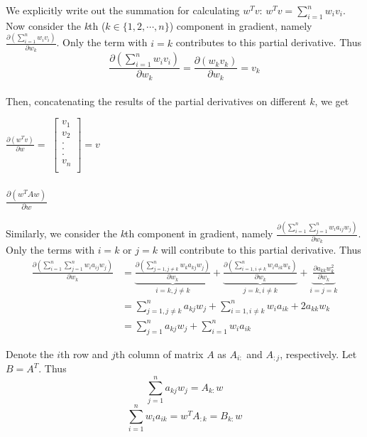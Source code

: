 \documentclass[11pt]{article}
\begin{document}
We explicitly write out the summation for calculating $w^{T}v$: $w^{T}v = \sum_{i=1}^n w_i v_i$. \\

Now consider the \textit{k}th ($k \in \{1, 2, \cdots, n\}$) component in gradient, namely $\frac{\partial (\sum_{i=1}^n w_i v_i)}{\partial w_k}$. Only the term with $i = k$ contributes to this partial derivative. Thus $$\frac{\partial (\sum_{i=1}^n w_i v_i)}{\partial w_k} = \frac{\partial (w_k v_k)}{\partial w_k} = v_k $$ \\

Then, concatenating the results of the partial derivatives on different $k$, we get
    \begin{center}
    $\frac{\partial (w^{T}v)}{\partial w} =$
    $\begin{bmatrix}
    v_1\\ 
    v_2 \\ . \\.\\.\\
    v_n\\
    \end{bmatrix}  = v$ 
    \end{center}

\subsubsection{$\frac{\partial (w^{T}Aw)}{\partial w}$}
Similarly, we consider the \textit{k}th component in gradient, namely $\frac{\partial (\sum_{i=1}^n \sum_{j=1}^n w_i a_{ij} w_j)}{\partial w_k}$. Only the terms with $i = k$ or $j = k$ will contribute to this partial derivative. Thus 
\begin{equation}
\begin{split}
\frac{\partial (\sum_{i=1}^n \sum_{j=1}^n w_i a_{ij} w_j)}{\partial w_k} & = \underbrace{\frac{\partial (\sum_{j = 1, j \neq k}^n w_k a_{kj} w_j)}{\partial w_k}}_{i = k, j \neq k}+\underbrace{\frac{\partial (\sum_{i = 1, i \neq k}^n w_i a_{ik} w_k)}{\partial w_k}}_{j = k, i \neq k} + \underbrace{\frac{\partial {a_{kk} w_k^2}}{\partial w_k}}_{i=j=k} \\
&= \sum_{j = 1, j \neq k}^n a_{kj} w_j+ \sum_{i = 1, i \neq k}^n w_i a_{ik} + 2 a_{kk}w_k\\
&=\sum_{j = 1}^n a_{kj} w_j+ \sum_{i = 1}^n w_i a_{ik}
\end{split}
\end{equation}

Denote the $i$th row and $j$th column of matrix $A$ as $A_{i:}$ and $A_{:j}$, respectively. Let $B = A^{T}$. Thus $$\sum_{j = 1}^n a_{kj} w_j = A_{k:}w$$ $$ \sum_{i = 1}^n w_i a_{ik} = w^{T}A_{:k} = B_{k:} w$$ \\
\end{document}

